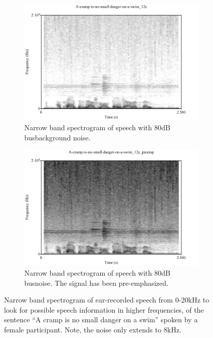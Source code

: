 \begin{figure}
\centering
\begin{subfigure}{0.475\textwidth}
  \centering
  \includegraphics[width=1\linewidth]{figure/spctgrmEarNarrow20kHz.pdf}
  \caption{Narrow band spectrogram of \DIFdelbeginFL {}\DIFdelendFL \DIFaddbeginFL {}\DIFaddendFL speech with 80dB \DIFdelbeginFL {}\DIFdelendFL \DIFaddbeginFL {}\DIFaddendFL bus\DIFdelbeginFL {}\DIFdelendFL \DIFaddbeginFL {}\DIFaddendFL background noise.}
  \label{spctgrmEarNarrow20kHz}
\end{subfigure}%
\hfill
\begin{subfigure}{0.475\textwidth}
  \centering
  \includegraphics[width=1\linewidth]{figure/spctgrmNarrowEarNoisePremp.pdf}
  \caption{Narrow band spectrogram of \DIFdelbeginFL {}\DIFdelendFL \DIFaddbeginFL {}\DIFaddendFL speech with 80dB \DIFdelbeginFL {}\DIFdelendFL \DIFaddbeginFL {}\DIFaddendFL bus\DIFdelbeginFL {}\DIFdelendFL \DIFaddbeginFL {}\DIFaddendFL noise.  The signal has been pre-emphasized.}
  \label{spctgrmNarrowEarNoisePremp_35}
\end{subfigure}
\caption{Narrow band spectrogram of ear-recorded speech from 0-20kHz to look for possible speech information in higher frequencies, of the sentence ``A cramp is no small danger on a swim'' spoken by a female participant. Note, the noise only extends to 8kHz.}
\end{figure}
